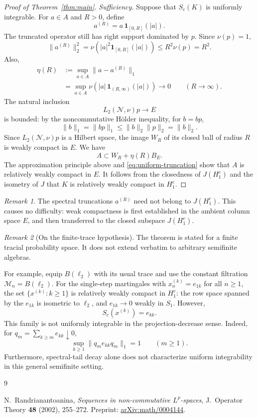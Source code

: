 \documentclass[11pt]{article}
\theoremstyle{remark}
\newtheorem*{remark}{Remark}
\newcommand{\M}{\mathcal M}
\newcommand{\N}{\mathcal N}
\newcommand{\HH}{H_1^c}
\newcommand{\ind}{\mathbf 1}
\begin{document}
\begin{proof}[Proof of Theorem~\ref{thm:main}]
\medskip
\noindent\emph{Sufficiency.}
Suppose that $S_c(K)$ is uniformly integrable. For $a\in A$ and $R>0$,
define
\[
  a^{(R)}=a\,\ind_{[0,R]}(|a|).
\]
The truncated operator still has right support dominated by $p$.
Since $\nu(p)=1$,
\[
  \|a^{(R)}\|_2^2
  =\nu\!\left(|a|^2\ind_{[0,R]}(|a|)\right)
  \leq R^2\nu(p)=R^2.
\]
Also,
\begin{equation}\label{eq:uniform-truncation}
  \begin{aligned}
  \eta(R)
  &:=\sup_{a\in A}\|a-a^{(R)}\|_1\\
  &=\sup_{a\in A}
     \nu\!\left(|a|\,\ind_{(R,\infty)}(|a|)\right)
    \longrightarrow 0
    \qquad (R\to\infty).
  \end{aligned}
\end{equation}
The natural inclusion
\[
  L_2(\N,\nu)p\longrightarrow E
\]
is bounded: by the noncommutative H\"older inequality, for $b=bp$,
\[
  \|b\|_1=\|bp\|_1
  \leq\|b\|_2\|p\|_2=\|b\|_2.
\]
Since $L_2(\N,\nu)p$ is a Hilbert space, the image $W_R$ of its closed
ball of radius $R$ is weakly compact in $E$. We have
\[
  A\subset W_R+\eta(R)B_E.
\]
The approximation principle above and \eqref{eq:uniform-truncation}
show that $A$ is relatively weakly compact in $E$. It follows from
the closedness of $J(\HH)$ and the isometry of $J$ that $K$ is relatively
weakly compact in $\HH$.
\end{proof}

\begin{remark}
The spectral truncations $a^{(R)}$ need not belong to $J(\HH)$.
This causes no difficulty: weak compactness is first established in the
ambient column space $E$, and then transferred to the closed subspace
$J(\HH)$.
\end{remark}

\begin{remark}[On the finite-trace hypothesis]
The theorem is stated for a finite tracial probability space. It does
not extend verbatim to arbitrary semifinite algebras.

For example, equip $B(\ell_2)$ with its usual trace and use the constant
filtration $\M_n=B(\ell_2)$. For the single-step martingales with
$x^{(k)}_n=e_{1k}$ for all $n\geq 1$, the set
$\{x^{(k)}:k\geq 1\}$ is relatively weakly compact in $H_1^c$:
the row space spanned by the $e_{1k}$ is isometric to $\ell_2$, and
$e_{1k}\to 0$ weakly in $S_1$. However,
\[
  S_c(x^{(k)})=e_{kk}.
\]
This family is not uniformly integrable in the projection-decrease
sense. Indeed, for $q_m=\sum_{k\geq m}e_{kk}\downarrow 0$,
\[
  \sup_{k\geq 1}\|q_m e_{kk}q_m\|_1=1
  \qquad (m\geq 1).
\]
Furthermore, spectral-tail decay alone does not characterize uniform
integrability in this general semifinite setting.
\end{remark}

\begin{thebibliography}{9}

N.~Randrianantoanina,
\emph{Sequences in non-commutative $L^p$-spaces},
J.~Operator Theory \textbf{48} (2002), 255--272.
Preprint: \href{https://arxiv.org/abs/math/0004144}{arXiv:math/0004144}.

\end{thebibliography}
\end{document}
